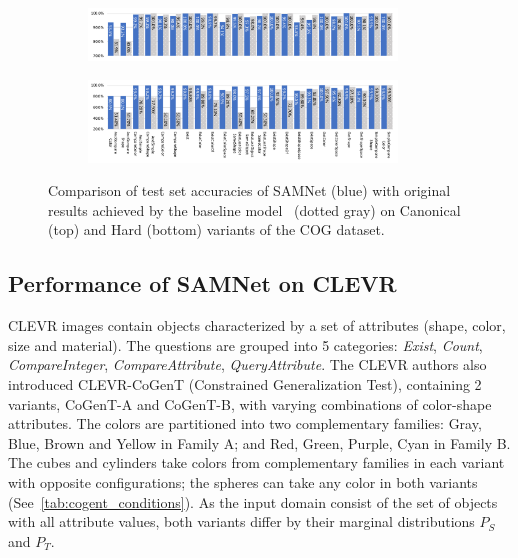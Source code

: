 \begin{figure}[t!]
	\centering
	\begin{subfigure}{\textwidth}
		\centering
		\includegraphics[width=0.9\textwidth]{../img/plots/cog_canonical_baseline_no_labels.pdf}
	\end{subfigure}%
	\newline
	\begin{subfigure}{\textwidth}
		\centering
		\includegraphics[width=0.9\textwidth]{../img/plots/cog_hard_baseline_labels.pdf}
	\end{subfigure}%
	\caption{Comparison of test set accuracies of SAMNet (blue) with original results achieved by the baseline model~\cite{yang2018dataset} (dotted gray) on Canonical (top) and Hard (bottom) variants of the COG dataset.}
	\label{fig:samnet_cog_detailed}
\end{figure}

\subsection{Performance of SAMNet on CLEVR}
\label{sec:clevr-baseline-compare}
CLEVR images contain objects characterized by a set of attributes (shape, color, size and material). The questions are grouped into 5 categories: \textit{Exist}, \textit{Count}, \textit{CompareInteger}, \textit{CompareAttribute}, \textit{QueryAttribute}.
The CLEVR authors also introduced CLEVR-CoGenT (Constrained Generalization Test), containing 2 variants, CoGenT-A and CoGenT-B, with varying combinations of color-shape attributes.
The colors are partitioned into two complementary families:
Gray, Blue, Brown and Yellow in Family A; and Red, Green, Purple, Cyan in Family B.
The cubes and cylinders take colors from complementary families in each variant with opposite configurations; the spheres can take any color in both variants (See~\cref{tab:cogent_conditions}).
As the input domain consist of the set of objects with all attribute values, both variants differ by their marginal distributions $P_S$ and $P_T$.

